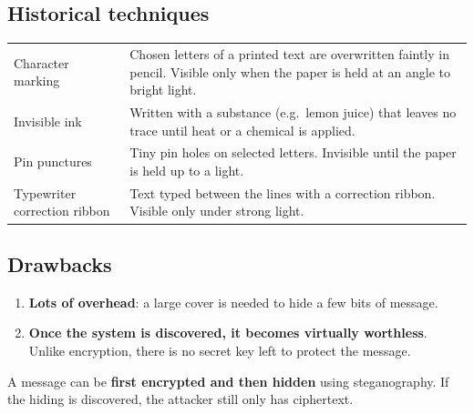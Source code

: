 \subsection{Historical techniques}
\begin{center}\small
\begin{tabularx}{\textwidth}{@{}l X@{}}
\toprule
Character marking & Chosen letters of a printed text are overwritten faintly in pencil. Visible only when the paper is held at an angle to bright light.\\
Invisible ink & Written with a substance (e.g.\ lemon juice) that leaves no trace until heat or a chemical is applied.\\
Pin punctures & Tiny pin holes on selected letters. Invisible until the paper is held up to a light.\\
Typewriter correction ribbon & Text typed between the lines with a correction ribbon. Visible only under strong light.\\
\bottomrule
\end{tabularx}
\end{center}

\subsection{Drawbacks}
\begin{enumerate}[leftmargin=1.5em]
  \item \textbf{Lots of overhead}: a large cover is needed to hide a few bits of message.
  \item \textbf{Once the system is discovered, it becomes virtually worthless}. Unlike encryption, there is no secret key left to protect the message.
\end{enumerate}
\begin{keybox}[title=Best of both]
A message can be \textbf{first encrypted and then hidden} using steganography. If the hiding is discovered, the attacker still only has ciphertext.
\end{keybox}
\begin{center}
\end{center}

